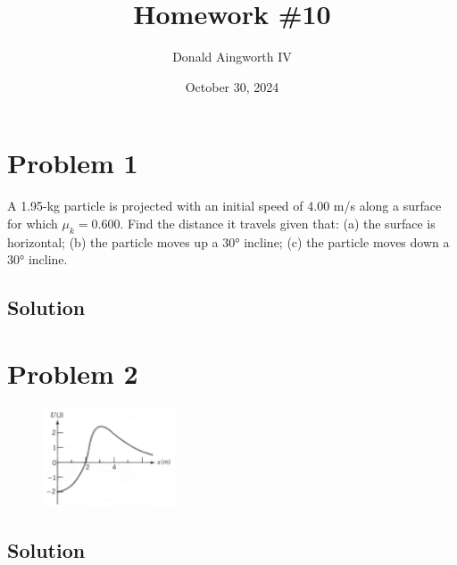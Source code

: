 \documentclass[12pt]{article}
\title{Homework \#10}
\author{Donald Aingworth IV}
\date{October 30, 2024}
\begin{document}

\maketitle

\pagebreak
\section*{Problem 1}
A 1.95-kg particle is projected with an initial speed of 4.00 m/s along a surface for which $\mu_k = 0.600$.
Find the distance it travels given that: (a) the surface is horizontal; (b) the particle moves up a 30\unit{\degree} incline;
(c) the particle moves down a 30\unit{\degree} incline.

\subsection*{Solution}

\pagebreak
\section*{Problem 2}
\begin{figure}
    \vspace{-30pt}
    \includegraphics[width=0.35\textwidth]{graph_2.png} 
\end{figure}

\subsection*{Solution}
\end{document}
